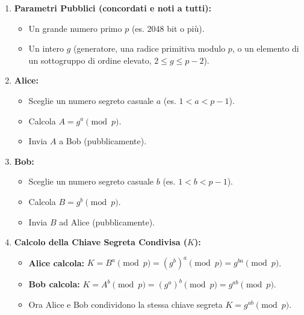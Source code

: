 \begin{itemize}
\begin{enumerate}
            \item \textbf{Parametri Pubblici (concordati e noti a tutti):}
                \begin{itemize}
                    \item Un grande numero primo $p$ (es. 2048 bit o più).
                    \item Un intero $g$ (generatore, una radice primitiva modulo $p$, o un elemento di un sottogruppo di ordine elevato, $2 \le g \le p-2$).
                \end{itemize}
            \item \textbf{Alice:}
                \begin{itemize}
                    \item Sceglie un numero segreto casuale $a$ (es. $1 < a < p-1$).
                    \item Calcola $A = g^a \pmod{p}$.
                    \item Invia $A$ a Bob (pubblicamente).
                \end{itemize}
            \item \textbf{Bob:}
                \begin{itemize}
                    \item Sceglie un numero segreto casuale $b$ (es. $1 < b < p-1$).
                    \item Calcola $B = g^b \pmod{p}$.
                    \item Invia $B$ ad Alice (pubblicamente).
                \end{itemize}
            \item \textbf{Calcolo della Chiave Segreta Condivisa ($K$):}
                \begin{itemize}
                    \item \textbf{Alice calcola:} $K = B^a \pmod{p} = (g^b)^a \pmod{p} = g^{ba} \pmod{p}$.
                    \item \textbf{Bob calcola:} $K = A^b \pmod{p} = (g^a)^b \pmod{p} = g^{ab} \pmod{p}$.
                    \item Ora Alice e Bob condividono la stessa chiave segreta $K = g^{ab} \pmod{p}$.
                \end{itemize}
        \end{enumerate}
        \begin{figure}[H]
        \centering
\end{figure}
\end{itemize}
